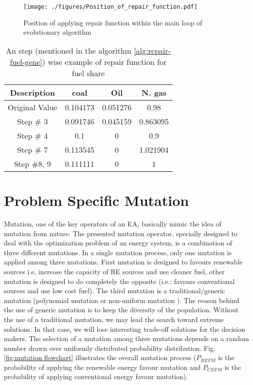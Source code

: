\documentclass{article}
\begin{document}
\begin{figure}
\centering

\texttt{[image: ./figures/Position\_of\_repair\_function.pdf]}
\caption{Position of applying repair function within the main loop of evolutionary algorithm}
\label{fig:position of repair function}
\end{figure}

\begin{table}[h]
\centering
\caption{An step (mentioned in the algorithm \ref{alg:repair-fuel-gene}) wise  example of repair function for fuel share}
\label{table:exaple of fuel share repair}
\begin{tabular}{cccc} \hline
Description & coal     & Oil      & N. gas   \\ \hline
Original Value   & 0.104173 & 0.051276 & 0.98     \\ \hline
Step \# 3        & 0.091746 & 0.045159 & 0.863095 \\ \hline
Step \# 4        & 0.1      & 0        & 0.9      \\\hline
Step \# 7        & 0.113545 & 0        & 1.021904 \\ \hline
Step \#8, 9      & 0.111111 & 0        & 1      \\ \hline
\end{tabular}

\end{table}

\section{Problem Specific Mutation}
Mutation, one of the key operators of an EA, basically mimic the idea of mutation from nature. 
The presented mutation operator, specially designed to deal with the optimization problem of an energy system, is a combination of three different mutations.
In a single mutation process, only one mutation is applied among three mutations.  
First mutation is designed to favours renewable sources i.e,  increase the capacity of RE sources and use cleaner fuel, other mutation is designed to do completely the opposite (i.e.: favours conventional sources and use low cost fuel). 
The third mutation is a traditional/generic mutation (polynomial mutation or non-uniform mutation \cite{Deb_2001}). 
The reason behind the use of generic mutation is to keep the diversity of the population. 
Without the use of a traditional mutation, we may lead the search toward extreme solutions. 
In that case, we will lose interesting trade-off solutions for the decision makers. 
The selection of a mutation among three mutations depends on a random number drawn over uniformly distributed probability distribution.
Fig. \ref{fig:mutation flowchart} illustrates the overall mutation process ($P_{REFM}$ is the probability of applying the renewable energy favour mutation and $P_{CEFM}$ is the probability of applying conventional energy favour mutation).
\end{document}
